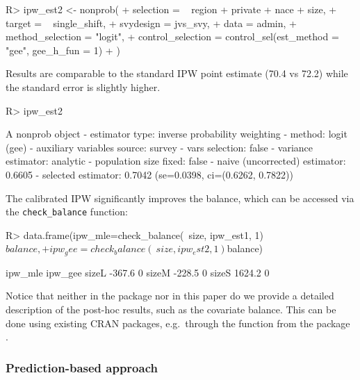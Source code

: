\documentclass[
]{jss}
\begin{document}
\begin{CodeChunk}
\begin{CodeInput}
R> ipw_est2 <- nonprob(
+   selection = ~ region + private + nace + size,
+   target = ~ single_shift,
+   svydesign = jvs_svy,
+   data = admin,
+   method_selection = "logit",
+   control_selection = control_sel(est_method = "gee", gee_h_fun = 1)
+ )
\end{CodeInput}
\end{CodeChunk}

Results are comparable to the standard IPW point estimate (70.4 vs 72.2)
while the standard error is slightly higher.

\begin{CodeChunk}
\begin{CodeInput}
R> ipw_est2
\end{CodeInput}
\begin{CodeOutput}
A nonprob object
 - estimator type: inverse probability weighting
 - method: logit (gee)
 - auxiliary variables source: survey
 - vars selection: false
 - variance estimator: analytic
 - population size fixed: false
 - naive (uncorrected) estimator: 0.6605
 - selected estimator: 0.7042 (se=0.0398, ci=(0.6262, 0.7822))
\end{CodeOutput}
\end{CodeChunk}

The calibrated IPW significantly improves the balance, which can be
accessed via the \texttt{check\_balance} function:

\begin{CodeChunk}
\begin{CodeInput}
R> data.frame(ipw_mle=check_balance(~size, ipw_est1, 1)$balance,
+            ipw_gee=check_balance(~size, ipw_est2, 1)$balance)
\end{CodeInput}
\begin{CodeOutput}
      ipw_mle ipw_gee
sizeL  -367.6       0
sizeM  -228.5       0
sizeS  1624.2       0
\end{CodeOutput}
\end{CodeChunk}

Notice that neither in the package nor in this paper do we provide a
detailed description of the post-hoc results, such as the covariate
balance. This can be done using existing CRAN packages, e.g.~through the
 function from the  package \citep{cobalt}.

\subsubsection{Prediction-based
approach}\label{prediction-based-approach}
\end{document}
